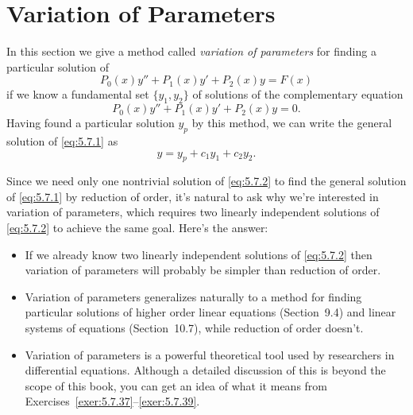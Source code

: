 \section{Variation of Parameters}

\noindent
In this section we give a method called {\color{blue}\it variation of parameters\/} for finding a
particular solution of
\begin{equation}
  \label{eq:5.7.1}P_{0}(x)y''+P_{1}(x)y'+P_{2}(x)y=F(x)
\end{equation}
if we know a fundamental set $\{y_{1},y_{2}\}$ of solutions of the complementary equation
\begin{equation}
  \label{eq:5.7.2}P_{0}(x)y''+P_{1}(x)y'+P_{2}(x)y=0.
\end{equation}
Having found a particular solution $y_{p}$ by this method, we can write the general solution of
\eqref{eq:5.7.1} as
\[
  y=y_{p}+c_{1}y_{1}+c_{2}y_{2}.
\]

Since we need only one nontrivial solution of \eqref{eq:5.7.2} to find the general solution of
\eqref{eq:5.7.1} by reduction of order, it's natural to ask why we're interested in variation of
parameters, which requires two linearly independent solutions of \eqref{eq:5.7.2} to achieve the
same goal. Here's the answer:

\begin{itemize}
  \item If we already know two linearly independent solutions of \eqref{eq:5.7.2} then variation of
        parameters will probably be simpler than reduction of order.

  \item Variation of parameters generalizes naturally to a method for finding particular solutions
        of higher order linear equations (Section~9.4) and linear systems of equations
        (Section~10.7), while reduction of order doesn't.

  \item Variation of parameters is a powerful theoretical tool used by researchers in differential
        equations. Although a detailed discussion of this is beyond the scope of this book, you can
        get an idea of what it means from Exercises~\ref{exer:5.7.37}--\ref{exer:5.7.39}.
\end{itemize}

